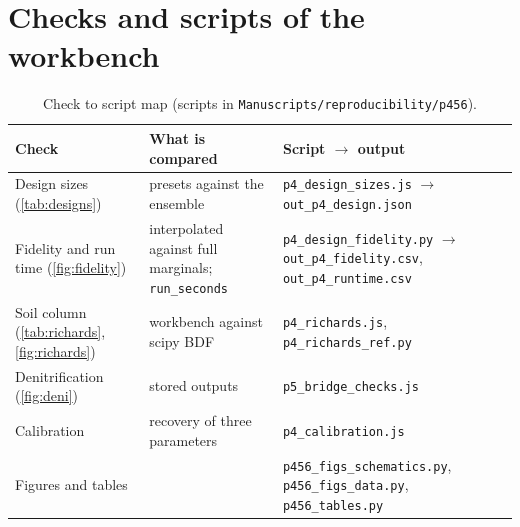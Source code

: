 

\appendix
\section{Checks and scripts of the workbench}\label{app:repro4}
\begin{table}[H]\centering\small
\caption{Check to script map (scripts in \texttt{Manuscripts/reproducibility/p456}).}
\begin{tabularx}{\textwidth}{>{\raggedright\arraybackslash}p{4.4cm}>{\raggedright\arraybackslash}p{4.4cm}X}
\toprule Check & What is compared & Script $\to$ output\\\midrule
Design sizes (\cref{tab:designs}) & presets against the ensemble & \texttt{p4\_design\_sizes.js} $\to$ \texttt{out\_p4\_design.json}\\
Fidelity and run time (\cref{fig:fidelity}) & interpolated against full marginals; \texttt{run\_seconds} & \texttt{p4\_design\_fidelity.py} $\to$ \texttt{out\_p4\_fidelity.csv}, \texttt{out\_p4\_runtime.csv}\\
Soil column (\cref{tab:richards}, \cref{fig:richards}) & workbench against scipy BDF & \texttt{p4\_richards.js}, \texttt{p4\_richards\_ref.py}\\
Denitrification (\cref{fig:deni}) & 792 stored outputs & \texttt{p5\_bridge\_checks.js}\\
Calibration & recovery of three parameters & \texttt{p4\_calibration.js}\\
Figures and tables & & \texttt{p456\_figs\_schematics.py}, \texttt{p456\_figs\_data.py}, \texttt{p456\_tables.py}\\\bottomrule
\end{tabularx}
\end{table}

